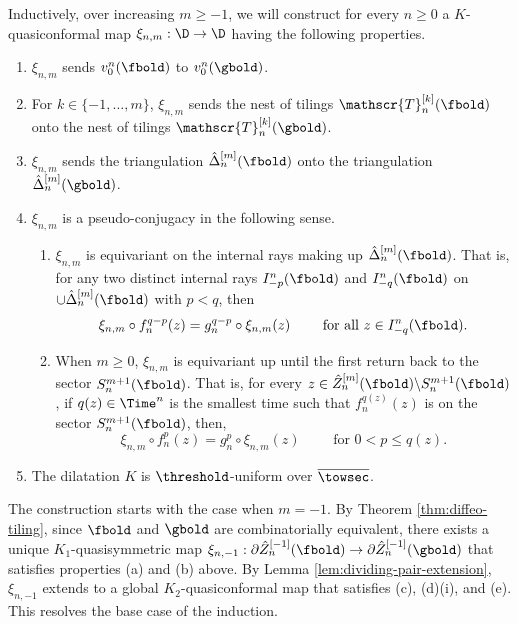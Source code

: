 \documentclass{amsart}
\begin{document}
Inductively, over increasing $m \geq -1$, we will construct for every $n \geq 0$ a $K$-quasiconformal map $\xi_{n,m}: \D \to \D$ having the following properties.
    \begin{enumerate}[label={(\textnormal{\alph*})}]
        \item $\xi_{n,m}$ sends $v^n_0(\fbold)$ to $v^n_0(\gbold)$.
        \item For $k \in \{-1,\ldots, m\}$, $\xi_{n,m}$ sends the nest of tilings $\mathscr{T}_n^{[k]}(\fbold)$ onto the nest of tilings $\mathscr{T}_n^{[k]}(\gbold)$.
        \item $\xi_{n,m}$ sends the triangulation $\hat{\Delta}_n^{[m]}(\fbold)$ onto the triangulation $\hat{\Delta}_n^{[m]}(\gbold)$.
        \item $\xi_{n,m}$ is a pseudo-conjugacy in the following sense. 
        \begin{enumerate}[label={(\textnormal{\roman*})}]
            \item $\xi_{n,m}$ is equivariant on the internal rays making up $\hat{\Delta}_n^{[m]}(\fbold)$. 
            That is, for any two distinct internal rays $I^n_{-p}(\fbold)$ and $I^n_{-q}(\fbold)$ on $\cup \hat{\Delta}_n^{[m]}(\fbold)$ with $p < q$, then
            \[
                \xi_{n,m} \circ f_n^{q-p}(z) = g_n^{q-p} \circ \xi_{n,m}(z) \qquad \text{ for all } z \in I^n_{-q}(\fbold).
            \]
            \item When $m \geq 0$, $\xi_{n,m}$ is equivariant up until the first return back to the sector $S_n^{m+1}(\fbold)$. 
            That is, for every $z \in \hat{Z}_n^{[m]}(\fbold) \backslash S_n^{m+1}(\fbold)$, if $q(z) \in \Time^n$ is the smallest time such that $f_n^{q(z)}(z)$ is on the sector $S_n^{m+1}(\fbold)$, then,
        \[
            \xi_{n,m} \circ f_n^p(z) = g_n^p \circ \xi_{n,m}(z) \qquad \text{ for } 0 < p \leq q(z).
        \]
        \end{enumerate}
        \item The dilatation $K$ is $\threshold$-uniform over $\overline{\towsec}$.
    \end{enumerate}

    The construction starts with the case when $m=-1$.
    By Theorem \ref{thm:diffeo-tiling}, since $\fbold$ and $\gbold$ are combinatorially equivalent, there exists a unique $K_1$-quasisymmetric map
    $\xi_{n,-1}: \partial \hat{Z}_n^{[-1]}(\fbold) \to \partial \hat{Z}_n^{[-1]}(\gbold)$
    that satisfies properties (a) and (b) above.
    By Lemma \ref{lem:dividing-pair-extension}, $\xi_{n,-1}$ extends to a global $K_2$-quasiconformal map that satisfies (c), (d)(i), and (e).
    This resolves the base case of the induction.
    
\end{document}
